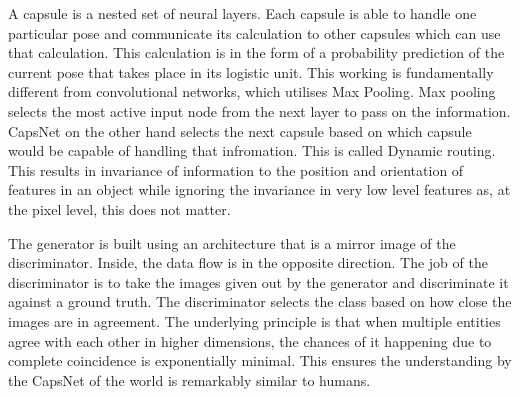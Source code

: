 A capsule is a nested set of neural layers. Each capsule is able to handle one particular pose and communicate its calculation to other capsules which can use that calculation. This calculation is in the form of a probability prediction of the current pose that takes place in its logistic unit. This working is fundamentally different from convolutional networks, which utilises Max Pooling. Max pooling selects the most active input node from the next layer to pass on the information. CapsNet on the other hand selects the next capsule based on which capsule would be capable of handling that infromation. This is called Dynamic routing. This results in invariance of information to the position and orientation of features in an object while ignoring the invariance in very low level features as, at the pixel level, this does not matter.
\par\bigskip

The generator is built using an architecture that is a mirror image of the discriminator. Inside, the data flow is in the opposite direction. The job of the discriminator is to take the images given out by the generator and discriminate it against a ground truth. The discriminator selects the class based on how close the images are in agreement. The underlying principle is that when multiple entities agree with each other in higher dimensions, the chances of it happening due to complete coincidence is exponentially minimal. This ensures the understanding by the CapsNet of the world is remarkably similar to humans.